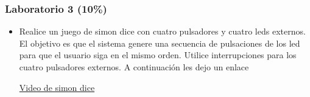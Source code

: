 \documentclass[10.5pt,scale=1.0,t,aspectratio=169,hyperref={pdfpagelabels=false}]{beamer}
\begin{document}
\begin{frame}
	\frametitle{Laboratorio 3 (10\%)}
	\begin{itemize}
		\item Realice un juego de simon dice con cuatro pulsadores y cuatro leds externos. El objetivo es que el sistema genere una secuencia de pulsaciones de los led para que el usuario siga en el mismo orden. Utilice interrupciones para los cuatro pulsadores externos. A continuación les dejo un enlace
		
		\href{https://www.youtube.com/watch?v=PK7zc28IGPc}{Video de simon dice}
	\end{itemize}
\end{frame}
\frame{
\begin{center}
	\LARGE \textcolor{blue}{INTERRUPCIONES}
\end{center}

\begin{center}
	\LARGE \textcolor{blue}{GRACIAS}
\end{center}
}

\end{document}
